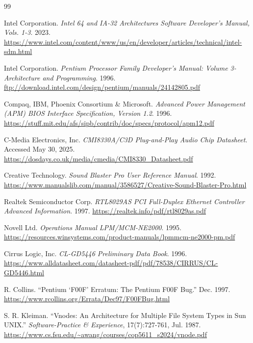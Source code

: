 \documentclass[12pt,a4paper]{report}
\begin{document}
	\cleardoublepage
	\begin{thebibliography}{99}
		
		Intel Corporation.  
		\textit{Intel 64 and IA-32 Architectures Software Developer's Manual, Vols. 1-3}.  
		2023.  
		\url{https://www.intel.com/content/www/us/en/developer/articles/technical/intel-sdm.html}
		
		Intel Corporation.  
		\textit{Pentium Processor Family Developer's Manual: Volume 3-Architecture and Programming}.  
		1996.  
		\url{ftp://download.intel.com/design/pentium/manuals/24142805.pdf}
		
		Compaq, IBM, Phoenix Consortium \& Microsoft.  
		\textit{Advanced Power Management (APM) BIOS Interface Specification, Version 1.2}.  
		1996.  
		\url{https://stuff.mit.edu/afs/sipb/contrib/doc/specs/protocol/apm12.pdf}
		
		C-Media Electronics, Inc.  
		\textit{CMI8330A/C3D Plug-and-Play Audio Chip Datasheet}.  
		Accessed May 30, 2025.  
		\url{https://dosdays.co.uk/media/cmedia/CMI8330_Datasheet.pdf}
		
		Creative Technology.  
		\textit{Sound Blaster Pro User Reference Manual}.  
		1992.  
		\url{https://www.manualslib.com/manual/3586527/Creative-Sound-Blaster-Pro.html}
		
		Realtek Semiconductor Corp.  
		\textit{RTL8029AS PCI Full-Duplex Ethernet Controller Advanced Information}.  
		1997.  
		\url{https://realtek.info/pdf/rtl8029as.pdf}
		
		Novell Ltd.  
		\textit{Operations Manual LPM/MCM-NE2000}.  
		1995.  
		\url{https://resources.winsystems.com/product-manuals/lpmmcm-ne2000-pm.pdf}
		
		Cirrus Logic, Inc.  
		\textit{CL-GD5446 Preliminary Data Book}.  
		1996.  
		\url{https://www.alldatasheet.com/datasheet-pdf/pdf/78538/CIRRUS/CL-GD5446.html}
		
		R. Collins.  
		“Pentium ‘F00F' Erratum: The Pentium F00F Bug.”  
		Dec. 1997.  
		\url{https://www.rcollins.org/Errata/Dec97/F00FBug.html}
		
		S. R. Kleiman.  
		“Vnodes: An Architecture for Multiple File System Types in Sun UNIX.”  
		\textit{Software-Practice \& Experience}, 17(7):727-761, Jul. 1987.  
		\url{https://www.cs.fsu.edu/~awang/courses/cop5611_s2024/vnode.pdf}
		

\end{thebibliography}
\end{document}
